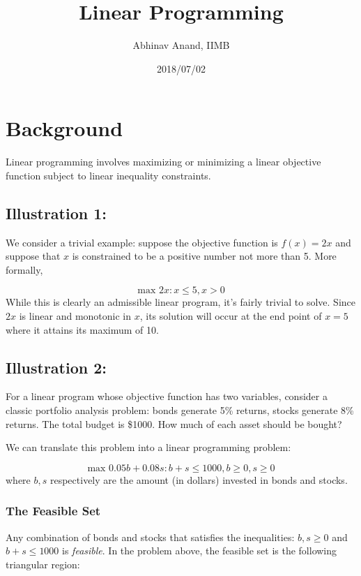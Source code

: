 \documentclass[11pt,]{article}
\title{Linear Programming}
\author{Abhinav Anand, IIMB}
\date{2018/07/02}
\begin{document}
\maketitle

\section{Background}\label{background}

Linear programming involves maximizing or minimizing a linear objective
function subject to linear inequality constraints.

\subsection{Illustration 1:}\label{illustration-1}

We consider a trivial example: suppose the objective function is
\(f(x) = 2x\) and suppose that \(x\) is constrained to be a positive
number not more than 5. More formally,

\[
\text{max } 2x: x\leq 5, x>0
\] While this is clearly an admissible linear program, it's fairly
trivial to solve. Since \(2x\) is linear and monotonic in \(x\), its
solution will occur at the end point of \(x=5\) where it attains its
maximum of 10.

\subsection{Illustration 2:}\label{illustration-2}

For a linear program whose objective function has two variables,
consider a classic portfolio analysis problem: bonds generate 5\%
returns, stocks generate 8\% returns. The total budget is \$1000. How
much of each asset should be bought?

We can translate this problem into a linear programming problem:

\[
\text{max } 0.05b+0.08s: b+s\leq 1000, b \geq 0, s \geq 0
\] where \(b, s\) respectively are the amount (in dollars) invested in
bonds and stocks.

\subsubsection{The Feasible Set}\label{the-feasible-set}

Any combination of bonds and stocks that satisfies the inequalities:
\(b ,s \geq 0\) and \(b+s\leq 1000\) is \emph{feasible}. In the problem
above, the feasible set is the following triangular region:
\end{document}
